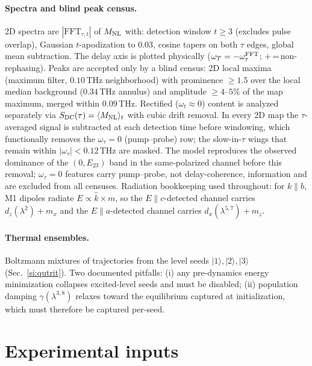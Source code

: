\documentclass[11pt]{article}
\newcommand{\ket}[1]{|#1\rangle}
\newcommand{\Mnl}{M_{\rm NL}}
\begin{document}
\paragraph{Spectra and blind peak census.}  2D spectra are
$|\mathrm{FFT}_{\tau,t}|$ of $\Mnl$ with: detection window $t\geq3$
(excludes pulse overlap), Gaussian $t$-apodization to $0.03$, cosine
tapers on both $\tau$ edges, global mean subtraction.  The delay axis is
plotted physically ($\omega_T=-\omega_\tau^{\rm FFT}$;
$+$\,=\,non-rephasing).  Peaks are accepted only by a blind census:
2D local maxima (maximum filter, $0.10$\,THz neighborhood) with
prominence $\geq1.5$ over the local median background
($0.34$\,THz annulus) and amplitude $\geq4$--$5\%$ of the map maximum,
merged within $0.09$\,THz.  Rectified ($\omega_t\approx0$) content is
analyzed separately via $S_{\rm DC}(\tau)=\langle\Mnl\rangle_t$ with
cubic drift removal.  In every 2D map the $\tau$-averaged signal is
subtracted at each detection time before windowing, which functionally
removes the $\omega_\tau=0$ (pump--probe) row; the slow-in-$\tau$
wings that remain within $|\omega_\tau|<0.12$\,THz are masked.  The
model reproduces the observed dominance of the $(0,E_{23})$ band in the
same-polarized channel before this removal; $\omega_\tau=0$ features
carry pump--probe, not delay-coherence, information and are excluded
from all censuses.  Radiation bookkeeping used throughout: for
$k\parallel b$, M1 dipoles radiate $E\propto\hat k\times m$, so the
$E\parallel c$-detected channel carries $d_z(\lambda^2)+m_x$ and the
$E\parallel a$-detected channel carries $d_x(\lambda^{5,7})+m_z$.

\paragraph{Thermal ensembles.}  Boltzmann mixtures of trajectories from
the level seeds $\ket1,\ket2,\ket3$ (Sec.~\ref{si:qutrit}).  Two
documented pitfalls: (i) any pre-dynamics energy minimization collapses
excited-level seeds and must be disabled; (ii) population damping
$\gamma(\lambda^{3,8})$ relaxes toward the equilibrium captured at
initialization, which must therefore be captured per-seed.

\section{Experimental inputs}
\label{si:exp}
\end{document}
